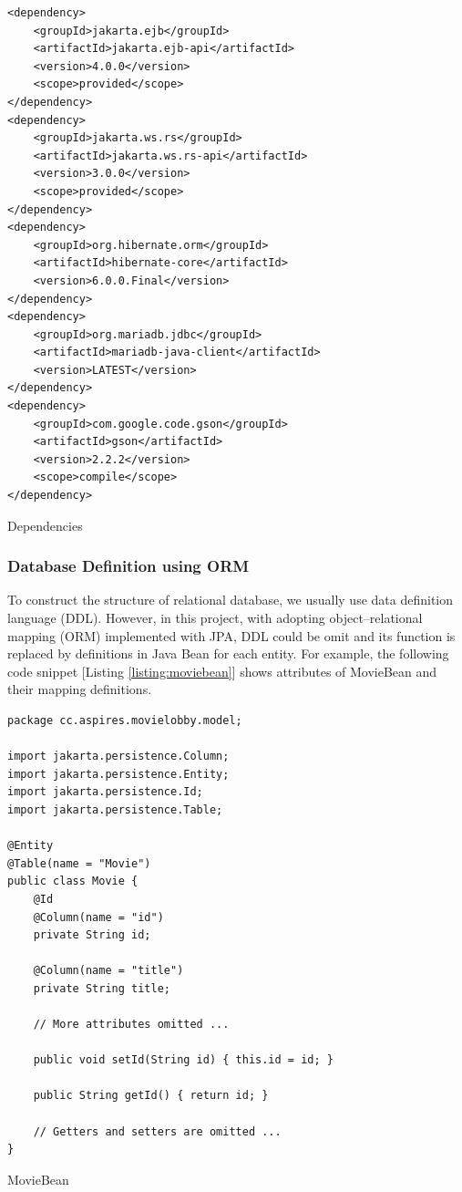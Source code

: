 \documentclass{article}
\begin{document}
\begin{listing}[!htp]
\begin{verbatim}
<dependency>
    <groupId>jakarta.ejb</groupId>
    <artifactId>jakarta.ejb-api</artifactId>
    <version>4.0.0</version>
    <scope>provided</scope>
</dependency>
<dependency>
    <groupId>jakarta.ws.rs</groupId>
    <artifactId>jakarta.ws.rs-api</artifactId>
    <version>3.0.0</version>
    <scope>provided</scope>
</dependency>
<dependency>
    <groupId>org.hibernate.orm</groupId>
    <artifactId>hibernate-core</artifactId>
    <version>6.0.0.Final</version>
</dependency>
<dependency>
    <groupId>org.mariadb.jdbc</groupId>
    <artifactId>mariadb-java-client</artifactId>
    <version>LATEST</version>
</dependency>
<dependency>
    <groupId>com.google.code.gson</groupId>
    <artifactId>gson</artifactId>
    <version>2.2.2</version>
    <scope>compile</scope>
</dependency>
\end{verbatim}
\caption{Dependencies}
\label{listing:dep}
\end{listing}


\subsubsection{Database Definition using ORM}

To construct the structure of relational database, we usually use data definition language (DDL). However, in this project, with adopting object–relational mapping (ORM) implemented with JPA, DDL could be omit and its function is replaced by definitions in Java Bean for each entity. For example, the following code snippet [Listing \ref{listing:moviebean}] shows attributes of MovieBean and their mapping definitions.

\begin{listing}[!htp]
\begin{verbatim}
package cc.aspires.movielobby.model;

import jakarta.persistence.Column;
import jakarta.persistence.Entity;
import jakarta.persistence.Id;
import jakarta.persistence.Table;

@Entity
@Table(name = "Movie")
public class Movie {
    @Id
    @Column(name = "id")
    private String id;

    @Column(name = "title")
    private String title;

    // More attributes omitted ...

    public void setId(String id) { this.id = id; }

    public String getId() { return id; }

    // Getters and setters are omitted ...
}
\end{verbatim}
\caption{MovieBean}
\label{listing:moviebean}
\end{listing}
\end{document}
